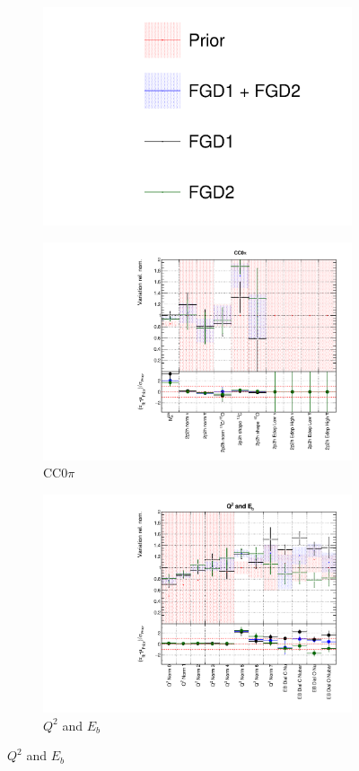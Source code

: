\begin{figure}
\centering
\begin{subfigure}{0.95\textwidth}
  \centering
  \includegraphics[width=0.25\linewidth]{figs/fgdfits_leg}
\end{subfigure}
\begin{subfigure}{0.49\textwidth}
  \centering
  \includegraphics[width=0.9\linewidth]{figs/fgdfitsxsec_1}
  \caption{CC0$\pi$}
\end{subfigure}
\begin{subfigure}{0.49\textwidth}
  \centering
  \includegraphics[width=0.9\linewidth]{figs/fgdfitsxsec_2}
  \caption{$Q^2$ and $E_b$}
\end{subfigure}

\end{figure}
